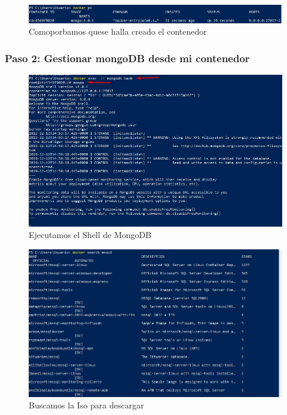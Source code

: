 \documentclass[preprint,12pt]{elsarticle}
\begin{document}
\begin{figure}[H]
	\begin{center}
		\includegraphics[width=12cm]{./IMAGENES/foto4} 
		\caption{Comoporbamos quese halla creado el contenedor}
	\end{center}
\end{figure}

\subsubsection{\textbf{Paso 2: Gestionar mongoDB desde mi contenedor}}

\begin{figure}[H]
	\begin{center}
		\includegraphics[width=12cm]{./IMAGENES/foto5} 
		\caption{Ejecutamos el Shell de MongoDB}
	\end{center}
\end{figure}


\begin{figure}[H]
	\begin{center}
		\includegraphics[width=12cm]{./IMAGENES/foto6} 
		\caption{Buscamos la Iso para descargar}
	\end{center}
\end{figure}
\end{document}
